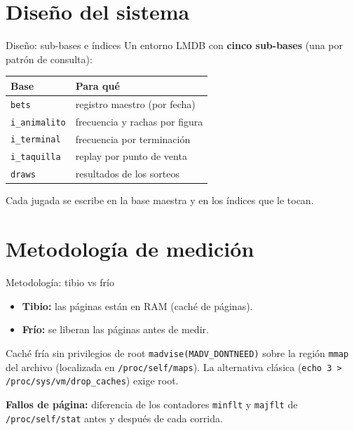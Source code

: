 \documentclass[aspectratio=169,11pt]{beamer}
\begin{document}
\section{Diseño del sistema}

\begin{frame}{Diseño: sub-bases e índices}
  Un entorno LMDB con \textbf{cinco sub-bases} (una por patrón de consulta):

  \vspace{0.3cm}
  \begin{table}
    \centering
    \footnotesize
    \begin{tabular}{@{}ll@{}}
      \toprule
      \textbf{Base} & \textbf{Para qué} \\
      \midrule
      \texttt{bets} & registro maestro (por fecha) \\
      \texttt{i\_animalito} & frecuencia y rachas por figura \\
      \texttt{i\_terminal} & frecuencia por terminación \\
      \texttt{i\_taquilla} & replay por punto de venta \\
      \texttt{draws} & resultados de los sorteos \\
      \bottomrule
    \end{tabular}
  \end{table}

  \vspace{0.2cm}
  Cada jugada se escribe en la base maestra y en los índices que le tocan.
\end{frame}

\section{Metodología de medición}

\begin{frame}{Metodología: tibio vs frío}
  \begin{itemize}
    \item \textbf{Tibio:} las páginas están en RAM (caché de páginas).
    \item \textbf{Frío:} se liberan las páginas antes de medir.
  \end{itemize}

  \vspace{0.3cm}
  \begin{alertblock}{Caché fría sin privilegios de root}
    \texttt{madvise(MADV\_DONTNEED)} sobre la región \texttt{mmap} del archivo
    (localizada en \texttt{/proc/self/maps}). La alternativa clásica
    (\texttt{echo 3 > /proc/sys/vm/drop\_caches}) exige root.
  \end{alertblock}

  \vspace{0.2cm}
  \textbf{Fallos de página:} diferencia de los contadores \texttt{minflt} y
  \texttt{majflt} de \texttt{/proc/self/stat} antes y después de cada corrida.
\end{frame}
\end{document}
